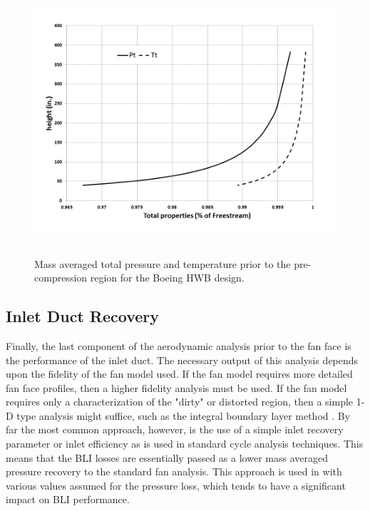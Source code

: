 \documentclass[12pt]{gatech-thesis}
\begin{document}
	\begin{figure}[htpb]
	\centering
	\includegraphics[width=130mm, height =100mm, clip=true, trim = 5mm 0mm 0mm 0mm]{Total_Properties.png}
	 \vspace{-25pt}
	\caption{Mass averaged total pressure and temperature prior to the pre-compression region for the Boeing HWB design.}
	\label{Total_Properties}
	\end{figure}
\subsection{Inlet Duct Recovery}
Finally, the last component of the aerodynamic analysis prior to the fan face is the performance of the inlet duct.  The necessary output of this analysis depends upon the fidelity of the fan model used.  If the fan model requires more detailed fan face profiles, then a higher fidelity analysis must be used.  If the fan model requires only a characterization of the "dirty" or distorted region, then a simple 1-D type analysis might suffice, such as the integral boundary layer method \cite{PlasThesis}.  By far the most common approach, however, is the use of a simple inlet recovery parameter or inlet efficiency as is used in standard cycle analysis techniques.  This means that the BLI losses are essentially passed as a lower mass averaged pressure recovery to the standard fan analysis.  This approach is used in \cite{Felder2011} \cite{Sato2011} \cite{Hardin2012} \cite{Nickol2009}  with various values assumed for the pressure loss, which tends to have a significant impact on BLI performance.
\end{document}

